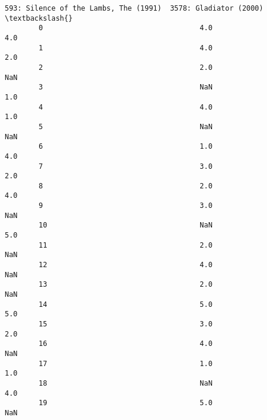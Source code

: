 \documentclass[11pt]{article}
\begin{document}
\begin{Verbatim}[commandchars=\\\{\}]
            593: Silence of the Lambs, The (1991)  3578: Gladiator (2000)  \textbackslash{}
        0                                     4.0                     4.0   
        1                                     4.0                     2.0   
        2                                     2.0                     NaN   
        3                                     NaN                     1.0   
        4                                     4.0                     1.0   
        5                                     NaN                     NaN   
        6                                     1.0                     4.0   
        7                                     3.0                     2.0   
        8                                     2.0                     4.0   
        9                                     3.0                     NaN   
        10                                    NaN                     5.0   
        11                                    2.0                     NaN   
        12                                    4.0                     NaN   
        13                                    2.0                     NaN   
        14                                    5.0                     5.0   
        15                                    3.0                     2.0   
        16                                    4.0                     NaN   
        17                                    1.0                     1.0   
        18                                    NaN                     4.0   
        19                                    5.0                     NaN   
        

\end{Verbatim}
\end{document}
